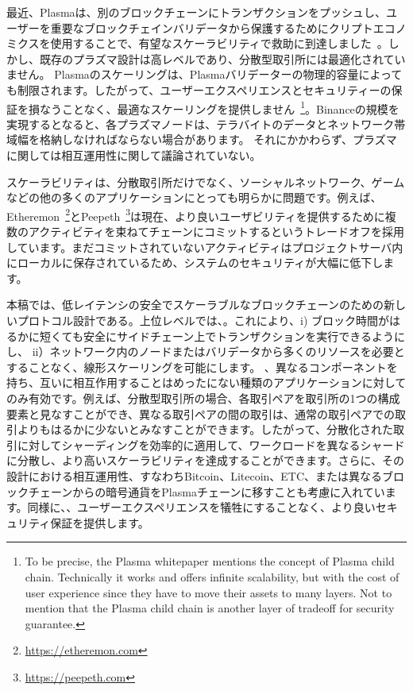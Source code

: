 最近、Plasmaは、別のブロックチェーンにトランザクションをプッシュし、ユーザーを重要なブロックチェインバリデータから保護するためにクリプトエコノミクスを使用することで、有望なスケーラビリティで救助に到達しました~\cite{plasma}。しかし、既存のプラズマ設計は高レベルであり、分散型取引所には最適化されていません。 Plasmaのスケーリングは、Plasmaバリデーターの物理的容量によっても制限されます。したがって、ユーザーエクスペリエンスとセキュリティーの保証を損なうことなく、最適なスケーリングを提供しません~\footnote{To be precise, the Plasma whitepaper mentions the concept of Plasma child chain. Technically it works and offers infinite scalability, but with the cost of user experience since they have to move their assets to many layers. Not to mention that the Plasma child chain is another layer of tradeoff for security guarantee.}。Binanceの規模を実現するとなると、各プラズマノードは、テラバイトのデータとネットワーク帯域幅を格納しなければならない場合があります。 それにかかわらず、プラズマに関しては相互運用性に関して議論されていない。

スケーラビリティは、分散取引所だけでなく、ソーシャルネットワーク、ゲームなどの他の多くのアプリケーションにとっても明らかに問題です。例えば、Etheremon~\footnote{\url{https://etheremon.com}}とPeepeth~\footnote{\url{https://peepeth.com}}は現在、より良いユーザビリティを提供するために複数のアクティビティを束ねてチェーンにコミットするというトレードオフを採用しています。まだコミットされていないアクティビティはプロジェクトサーバ内にローカルに保存されているため、システムのセキュリティが大幅に低下します。

本稿では、低レイテンシの安全でスケーラブルなブロックチェーンのための新しいプロトコル設計である。上位レベルでは、。これにより、i) ブロック時間がはるかに短くても安全にサイドチェーン上でトランザクションを実行できるようにし、 ii）ネットワーク内のノードまたはバリデータから多くのリソースを必要とすることなく、線形スケーリングを可能にします。 、異なるコンポーネントを持ち、互いに相互作用することはめったにない種類のアプリケーションに対してのみ有効です。例えば、分散型取引所の場合、各取引ペアを取引所の1つの構成要素と見なすことができ、異なる取引ペアの間の取引は、通常の取引ペアでの取引よりもはるかに少ないとみなすことができます。したがって、分散化された取引に対してシャーディングを効率的に適用して、ワークロードを異なるシャードに分散し、より高いスケーラビリティを達成することができます。さらに、その設計における相互運用性、すなわちBitcoin、Litecoin、ETC、または異なるブロックチェーンからの暗号通貨をPlasmaチェーンに移すことも考慮に入れています。同様に、、ユーザーエクスペリエンスを犠牲にすることなく、より良いセキュリティ保証を提供します。

